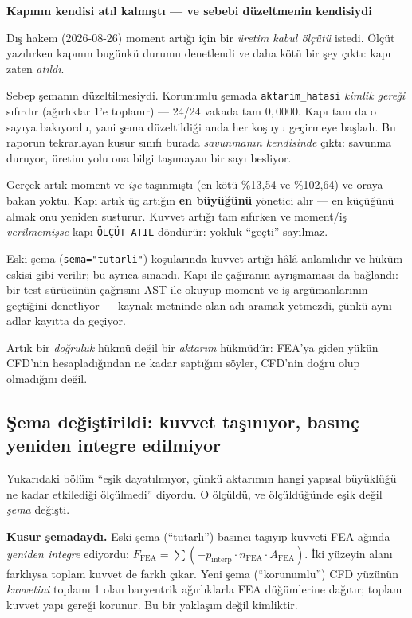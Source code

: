 \documentclass[11pt,a4paper]{article}
\newcommand{\kkkenar}{lacivert}
\newcommand{\kkzemin}{kod}
\newenvironment{renkkutu}[3]{%
  \renewcommand{\kkkenar}{#1}\renewcommand{\kkzemin}{#2}%
  \par\medskip\noindent
  \begin{lrbox}{\kutugovde}%
  \begin{minipage}{\dimexpr\linewidth-2\fboxsep-2\fboxrule\relax}\footnotesize
  \textcolor{#1}{\textbf{#3}}\par\vspace{3pt}%
}{%
  \end{minipage}%
  \end{lrbox}%
  \noindent\fcolorbox{\kkkenar}{\kkzemin}{\usebox{\kutugovde}}%
  \par\medskip
}
\newenvironment{dikkat}[1]{\begin{renkkutu}{orta}{ortabg}{#1}}{\end{renkkutu}}
\begin{document}
\begin{dikkat}{Kapının kendisi atıl kalmıştı --- ve sebebi düzeltmenin kendisiydi}
Dış hakem (2026-08-26) moment artığı için bir \emph{üretim kabul ölçütü}
istedi. Ölçüt yazılırken kapının bugünkü durumu denetlendi ve daha kötü bir
şey çıktı: kapı zaten \emph{atıldı}.

\noindent Sebep şemanın düzeltilmesiydi. Korunumlu şemada
\texttt{aktarim\_hatasi} \emph{kimlik gereği} sıfırdır (ağırlıklar 1'e
toplanır) --- 24/24 vakada tam $0{,}0000$. Kapı tam da o sayıya bakıyordu,
yani şema düzeltildiği anda her koşuyu geçirmeye başladı. Bu raporun
tekrarlayan kusur sınıfı burada \emph{savunmanın kendisinde} çıktı:
savunma duruyor, üretim yolu ona bilgi taşımayan bir sayı besliyor.

\noindent Gerçek artık moment ve \emph{işe} taşınmıştı (en kötü
\%13{,}54 ve \%102{,}64) ve oraya bakan yoktu. Kapı artık üç artığın
\textbf{en büyüğünü} yönetici alır --- en küçüğünü almak onu yeniden
susturur. Kuvvet artığı tam sıfırken ve moment/iş \emph{verilmemişse} kapı
\texttt{ÖLÇÜT ATIL} döndürür: yokluk ``geçti'' sayılmaz.

\noindent Eski şema (\texttt{sema="tutarli"}) koşularında kuvvet artığı hâlâ
anlamlıdır ve hüküm eskisi gibi verilir; bu ayrıca sınandı. Kapı ile
çağıranın ayrışmaması da bağlandı: bir test sürücünün çağrısını AST ile
okuyup moment ve iş argümanlarının geçtiğini denetliyor --- kaynak metninde
alan adı aramak yetmezdi, çünkü aynı adlar kayıtta da geçiyor.
\end{dikkat}

\noindent Artık bir \emph{doğruluk} hükmü değil bir \emph{aktarım} hükmüdür:
FEA'ya giden yükün CFD'nin hesapladığından ne kadar saptığını söyler, CFD'nin
doğru olup olmadığını değil.

\subsection{Şema değiştirildi: kuvvet taşınıyor, basınç yeniden integre edilmiyor}
\label{sub:fsi-korunumlu}

Yukarıdaki bölüm ``eşik dayatılmıyor, çünkü aktarımın hangi yapısal büyüklüğü
ne kadar etkilediği ölçülmedi'' diyordu. O ölçüldü, ve ölçüldüğünde eşik değil
\emph{şema} değişti.

\textbf{Kusur şemadaydı.} Eski şema (``tutarlı'') basıncı taşıyıp kuvveti FEA
ağında \emph{yeniden integre} ediyordu: $F_{\text{FEA}} = \sum(-p_{\text{interp}}
\cdot n_{\text{FEA}} \cdot A_{\text{FEA}})$. İki yüzeyin alanı farklıysa toplam
kuvvet de farklı çıkar. Yeni şema (``korunumlu'') CFD yüzünün \emph{kuvvetini}
toplamı 1 olan baryentrik ağırlıklarla FEA düğümlerine dağıtır; toplam kuvvet
yapı gereği korunur. Bu bir yaklaşım değil kimliktir.
\end{document}
